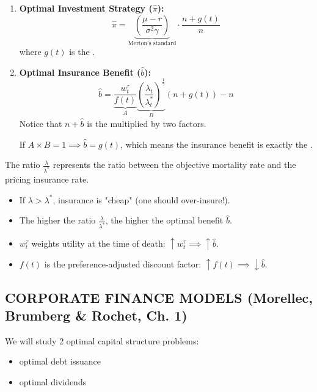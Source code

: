 \begin{enumerate}
    \item[2.] \textbf{Optimal Investment Strategy ($\hat{\pi}$):}
    \begin{equation*}
        \hat{\pi} = \underbrace{\left( \frac{\mu - r}{\sigma^2 \gamma} \right)}_{\text{Merton's standard}} \cdot \frac{n + g(t)}{n}
    \end{equation*}
    where $g(t)$ is the .

    \item[3.] \textbf{Optimal Insurance Benefit ($\hat{b}$):}
    \begin{equation*}
        \hat{b} = \underbrace{\frac{w_t^\tau}{f(t)}}_{A} \underbrace{\left( \frac{\lambda_t}{\lambda_t^*} \right)^{\frac{1}{\gamma}}}_{B} (n + g(t)) - n
    \end{equation*}
    Notice that $n + \hat{b}$ is the  multiplied by two factors.
    
    If $A \times B = 1 \implies \hat{b} = g(t)$, which means the insurance benefit is exactly the .
\end{enumerate}

The ratio $\frac{\lambda}{\lambda^*}$ represents the ratio between the objective mortality rate and the pricing insurance rate.
\begin{itemize}
    \item If $\lambda > \lambda^*$, insurance is "cheap" (one should over-insure!).
    \item The higher the ratio $\frac{\lambda}{\lambda^*}$, the higher the optimal benefit $\hat{b}$.
    \item $w_t^\tau$ weights utility at the time of death: $\uparrow w_t^\tau \implies \uparrow \hat{b}$.
    \item $f(t)$ is the preference-adjusted discount factor: $\uparrow f(t) \implies \downarrow \hat{b}$.
\end{itemize}

\subsection*{\color{red}CORPORATE FINANCE MODELS (Morellec, Brumberg \& Rochet, Ch. 1)}

We will study 2 optimal capital structure problems:
\begin{itemize}
    \item optimal debt issuance
    \item optimal dividends
\end{itemize}

